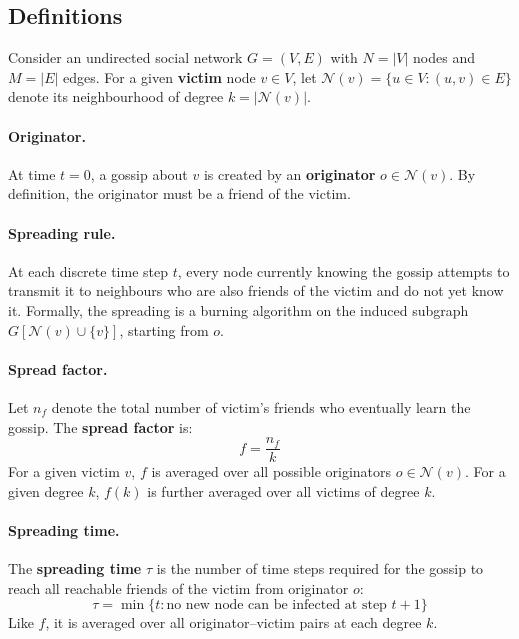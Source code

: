 \documentclass[9pt,a4paper,twocolumn,twoside]{tau-class/tau}
\begin{document}
\subsection{Definitions}

Consider an undirected social network $G = (V, E)$ with $N = |V|$ nodes and $M = |E|$ edges. For a given \textbf{victim} node $v \in V$, let $\mathcal{N}(v) = \{u \in V : (u,v) \in E\}$ denote its neighbourhood of degree $k = |\mathcal{N}(v)|$.

\paragraph{Originator.} At time $t=0$, a gossip about $v$ is created by an \textbf{originator} $o \in \mathcal{N}(v)$. By definition, the originator must be a friend of the victim.

\paragraph{Spreading rule.} At each discrete time step $t$, every node currently knowing the gossip attempts to transmit it to neighbours who are also friends of the victim and do not yet know it. Formally, the spreading is a burning algorithm \cite{lind2007pre} on the induced subgraph $G[\mathcal{N}(v) \cup \{v\}]$, starting from $o$.

\paragraph{Spread factor.} Let $n_f$ denote the total number of victim's friends who eventually learn the gossip. The \textbf{spread factor} is:
\begin{equation}\label{eq:f}
    f = \frac{n_f}{k}
\end{equation}
For a given victim $v$, $f$ is averaged over all possible originators $o \in \mathcal{N}(v)$. For a given degree $k$, $f(k)$ is further averaged over all victims of degree $k$.

\paragraph{Spreading time.} The \textbf{spreading time} $\tau$ is the number of time steps required for the gossip to reach all reachable friends of the victim from originator $o$:
\begin{equation}\label{eq:tau}
    \tau = \min\{t : \text{no new node can be infected at step } t+1\}
\end{equation}
Like $f$, it is averaged over all originator--victim pairs at each degree $k$.
\end{document}

